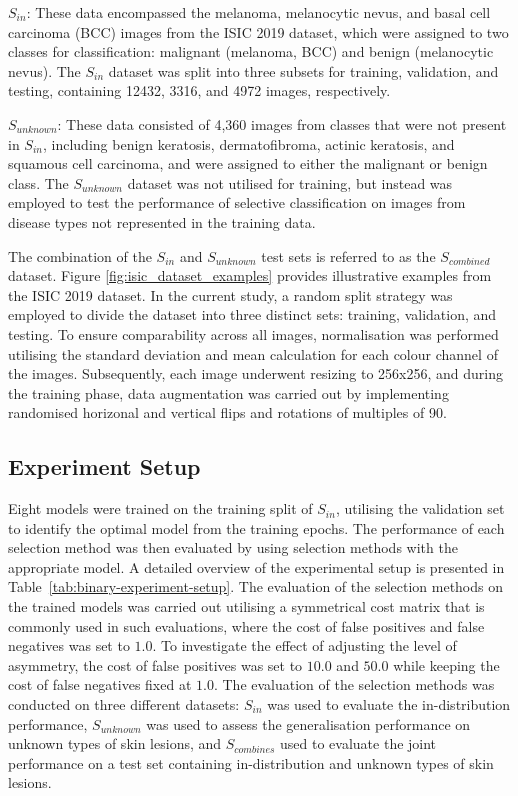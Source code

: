 $S_{in}$: These data encompassed the melanoma, melanocytic nevus, and basal cell carcinoma (BCC) images from the ISIC 2019 dataset, which were assigned to two classes for classification: malignant (melanoma, BCC) and benign (melanocytic nevus). The $S_{in}$ dataset was split into three subsets for training, validation, and testing, containing 12432, 3316, and 4972 images, respectively.

$S_{unknown}$: These data consisted of 4,360 images from classes that were not present in $S_{in}$, including benign keratosis, dermatofibroma, actinic keratosis, and squamous cell carcinoma, and were assigned to either the malignant or benign class. The $S_{unknown}$ dataset was not utilised for training, but instead was employed to test the performance of selective classification on images from disease types not represented in the training data.

The combination of the $S_{in}$ and $S_{unknown}$ test sets is referred to as the $S_{combined}$ dataset. Figure \ref{fig:isic_dataset_examples} provides illustrative examples from the ISIC 2019 dataset. In the current study, a random split strategy was employed to divide the dataset into three distinct sets: training, validation, and testing. To ensure comparability across all images, normalisation was performed utilising the standard deviation and mean calculation for each colour channel of the images. Subsequently, each image underwent resizing to 256x256, and during the training phase, data augmentation was carried out by implementing randomised horizonal and vertical flips and rotations of multiples of 90\textdegree.

\subsection{Experiment Setup}
Eight models were trained on the training split of $S_{in}$, utilising the validation set to identify the optimal model from the training epochs. The performance of each selection method was then evaluated by using selection methods with the appropriate model. A detailed overview of the experimental setup is presented in Table~\ref{tab:binary-experiment-setup}. The evaluation of the selection methods on the trained models was carried out utilising a symmetrical cost matrix that is commonly used in such evaluations, where the cost of false positives and false negatives was set to $1.0$. To investigate the effect of adjusting the level of asymmetry, the cost of false positives was set to $10.0$ and $50.0$ while keeping the cost of false negatives fixed at $1.0$. The evaluation of the selection methods was conducted on three different datasets: $S_{in}$ was used to evaluate the in-distribution performance, $S_{unknown}$ was used to assess the generalisation performance on unknown types of skin lesions, and $S_{combines}$ used to evaluate the joint performance on a test set containing in-distribution and unknown types of skin lesions.

